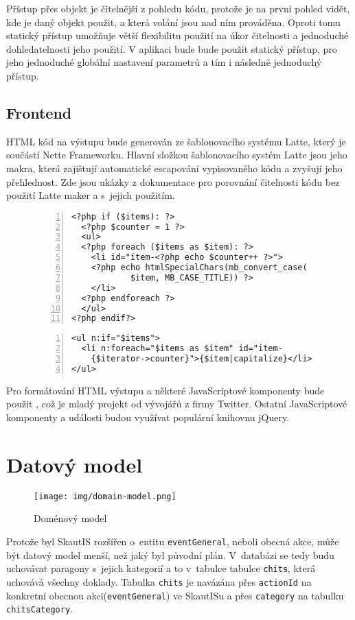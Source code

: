 \documentclass[thesis=B,czech]{FITthesis}[2012/04/27]
\begin{document}
Přístup přes objekt je čitelnější z pohledu kódu, protože je na první pohled vidět, kde je daný objekt použit, a která volání jsou nad ním prováděna. Oproti tomu statický přístup umožňuje větší flexibilitu použití na úkor čitelnosti a jednoduché dohledatelnosti jeho použití. V aplikaci bude bude použit statický přístup, pro jeho jednoduché globální nastavení parametrů a tím i následně jednoduchý přístup.

\subsection{Frontend}
HTML kód na výstupu bude generován ze šablonovacího systému Latte, který je součástí Nette Frameworku. Hlavní složkou šablonovacího systém Latte jsou jeho makra, která zajištují automatické escapování vypisovaného kódu a zvyšují jeho přehlednost. Zde jsou ukázky z dokumentace \cite{latte} pro porovnání čitelnosti kódu bez použití Latte maker a s~jejich použitím.

\begin{figure}[h]
\begin{lstlisting}[caption=Vypsání seznamu položek bez použití Latte, numbers=left]
<?php if ($items): ?>
  <?php $counter = 1 ?>
  <ul>
  <?php foreach ($items as $item): ?>
    <li id="item-<?php echo $counter++ ?>">
    <?php echo htmlSpecialChars(mb_convert_case(
      		$item, MB_CASE_TITLE)) ?>
    </li>
  <?php endforeach ?>
  </ul>
<?php endif?>
\end{lstlisting}

\begin{lstlisting}[caption=Vypsání seznamu položek pomocí Latte, numbers=left]
<ul n:if="$items">
  <li n:foreach="$items as $item" id="item-
    {$iterator->counter}">{$item|capitalize}</li>
</ul>
\end{lstlisting}
\end{figure}

Pro formátování HTML výstupu a některé JavaScriptové komponenty bude použit \cite{twBootstrap}, což je mladý projekt od vývojářů z firmy Twitter. Ostatní JavaScriptové komponenty a události budou využívat populární knihovnu jQuery\cite{jquery}.

\section{Datový model}
\begin{figure}[h] \centering
 	\caption[Doménový model]{Doménový model}\label{fig:domain-model}
	\texttt{[image: img/domain-model.png]}
\end{figure}
Protože byl SkautIS rozšířen o~entitu \texttt{eventGeneral}, neboli obecná akce, může být datový model menší, než jaký byl původní plán. V~databázi se tedy budu uchovávat paragony s~jejich kategorií a to v~tabulce tabulce \texttt{chits}, která uchovává všechny doklady. Tabulka \texttt{chits} je navázána přes \texttt{actionId} na konkretní obecnou akci(\texttt{eventGeneral}) ve SkautISu a přes \texttt{category} na tabulku \texttt{chitsCategory}.
\end{document}
